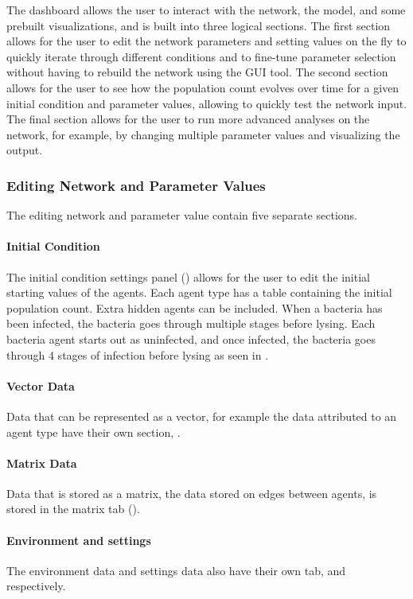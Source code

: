 The dashboard allows the user to interact with the network, the model, and some prebuilt visualizations, and is built into three logical sections.
The first section allows for the user to edit the network parameters and setting values on the fly to quickly iterate through different conditions and to fine-tune parameter selection without having to rebuild the network using the GUI tool.
The second section allows for the user to see how the population count evolves over time for a given initial condition and parameter values, allowing to quickly test the network input.
The final section allows for the user to run more advanced analyses on the network, for example, by changing multiple parameter values and visualizing the output. 

\subsubsection{Editing Network and Parameter Values}
\label{sec:editing_network_and_parameter_values}
The editing network and parameter value contain five separate sections.
\paragraph{Initial Condition}
The initial condition settings panel () allows for the user to edit the initial starting values of the agents. 
Each agent type has a table containing the initial population count. 
Extra hidden agents can be included. 
When a bacteria has been infected, the bacteria goes through multiple stages before lysing. Each bacteria agent starts out as uninfected, and once infected, the bacteria goes through 4 stages of infection before lysing as seen in .  
\paragraph{Vector Data} 
Data that can be represented as a vector, for example the data attributed to an agent type have their own section, .
\paragraph{Matrix Data}
Data that is stored as a matrix, the data stored on edges between agents, is stored in the matrix tab ().
\paragraph{Environment and settings}
The environment data and settings data also have their own tab,  and  respectively.

